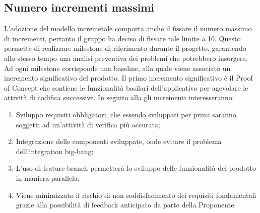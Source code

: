 \subsection{Numero incrementi massimi}
L'adozione del modello incremetale comporta anche il fissare il numero massimo di incrementi, pertanto il gruppo ha deciso di fissare tale limite a 10. Questo permette di realizzare {milestone} di riferimento durante il progetto, garantendo allo stesso tempo una analisi preventiva dei problemi che potrebbero insorgere. Ad ogni milestone corrisponde una baseline, alla quale viene associato un incremento significativo del prodotto. Il primo incremento significativo è il {Proof of Concept} che contiene le funzionalità basilari dell'applicativo per agevolare le attività di codifica successive. In seguito alla \RP{} gli incrementi interesseranno:
\begin{enumerate}
	\item Sviluppo requisiti obbligatori, che essendo sviluppati per primi saranno soggetti ad un'attività di verifica più accurata;
	\item Integrazione delle componenti sviluppate, onde evitare il problema dell'{integration big-bang};
	\item L'uso di {feature branch} permetterà lo sviluppo delle funzionalità del prodotto in maniera parallela;
	\item Viene minimizzato il rischio di non soddisfacimento dei requisiti fondamentali grazie alla possibilità di feedback anticipato da parte della Proponente.
\end{enumerate}